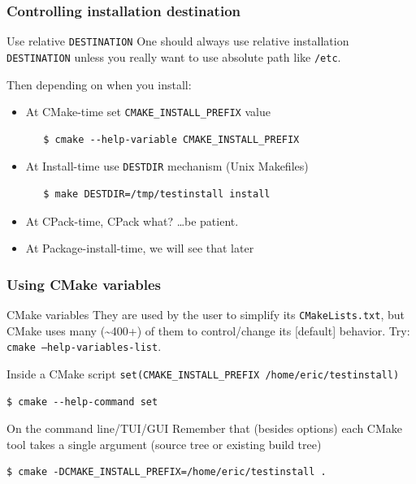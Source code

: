 \documentclass[compress,slidestop,table,usepdftitle=false
              ]
               {beamer}
\newcommand{\fname}[1]{\texttt{#1}}
\begin{document}
\begin{frame}[fragile]
\frametitle{Controlling installation destination}
\begin{alertblock}{Use relative \lstinline!DESTINATION!}
One should always use relative installation \lstinline!DESTINATION!
unless you really want to use absolute path like \fname{/etc}.
\end{alertblock}
Then depending on when you install:
\begin{itemize}
\pause
\item At \textcolor{cmaketimec}{CMake-time} set \lstinline!CMAKE_INSTALL_PREFIX! value

     \begin{Verbatim}
   $ cmake --help-variable CMAKE_INSTALL_PREFIX
     \end{Verbatim}
\pause
\item At \textcolor{installtimec}{Install-time} use \fname{DESTDIR} mechanism (Unix Makefiles)

      \begin{Verbatim}
   $ make DESTDIR=/tmp/testinstall install
      \end{Verbatim}
\pause
\item At \textcolor{cpacktimec}{CPack-time}, CPack what? \ldots be patient.
\item At \textcolor{installtimec}{Package-install-time}, we will see that later
\end{itemize}
\end{frame}


\begin{frame}[fragile]
\frametitle{Using CMake variables}
\begin{block}{CMake variables}
They are used by the user to simplify its \fname{CMakeLists.txt},
but CMake uses many (\textasciitilde 400+) of them to control/change its [default] behavior.
Try: \texttt{cmake --help-variables-list}.
\end{block}
\begin{block}{Inside a CMake script}
\lstinline!set(CMAKE_INSTALL_PREFIX /home/eric/testinstall)!
\begin{Verbatim}
$ cmake --help-command set
\end{Verbatim}
\end{block}
\begin{block}{On the command line/TUI/GUI}
Remember that (besides options) each CMake tool takes a single argument
(source tree or \alert{existing} build tree)
\begin{Verbatim}[fontsize=\scriptsize]
$ cmake -DCMAKE_INSTALL_PREFIX=/home/eric/testinstall .
\end{Verbatim}
\end{block}
\end{frame}
\end{document}
